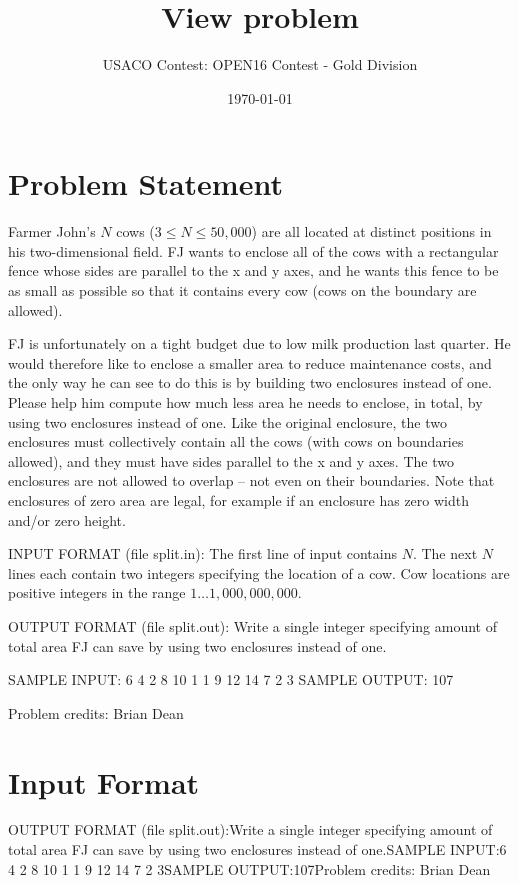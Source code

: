 \documentclass[12pt]{article}
\title{View problem}
\author{USACO Contest: OPEN16 Contest - Gold Division}
\date{\today}
\begin{document}
\maketitle

\section*{Problem Statement}

Farmer John's $N$ cows ($3 \leq N \leq 50,000$) are all located at distinct
positions in his two-dimensional field.  FJ wants to enclose all of the cows
with a rectangular fence whose sides are parallel to the x and y axes, and he
wants this fence to be as small as possible so that it contains every cow (cows
on the boundary are allowed).  

FJ is unfortunately on a tight budget due to low milk production last quarter.
He would therefore like to enclose a smaller area to reduce maintenance costs,
and the only way he can see to do this is by building two enclosures instead of
one.  Please help him compute how much less area he needs to enclose, in total,
by using two enclosures instead of one.  Like the original enclosure, the two
enclosures must collectively contain all the cows (with cows on boundaries
allowed), and they must have sides parallel to the x and y axes.  The two
enclosures are not allowed to overlap -- not even on their boundaries. Note that
enclosures of zero area are legal, for example if an enclosure has zero width
and/or zero height.

INPUT FORMAT (file split.in):
The first line of input contains $N$.  The next $N$ lines each contain two
integers specifying the location of a cow.  Cow locations are positive integers
in the range $1 \ldots 1,000,000,000$.

OUTPUT FORMAT (file split.out):
Write a single integer specifying amount of total area FJ can save by using two 
enclosures instead of one.

SAMPLE INPUT:
6
4 2
8 10
1 1
9 12
14 7
2 3
SAMPLE OUTPUT: 
107


Problem credits: Brian Dean



\section*{Input Format}
OUTPUT FORMAT (file split.out):Write a single integer specifying amount of total area FJ can save by using two 
enclosures instead of one.SAMPLE INPUT:6
4 2
8 10
1 1
9 12
14 7
2 3SAMPLE OUTPUT:107Problem credits: Brian Dean
\end{document}
